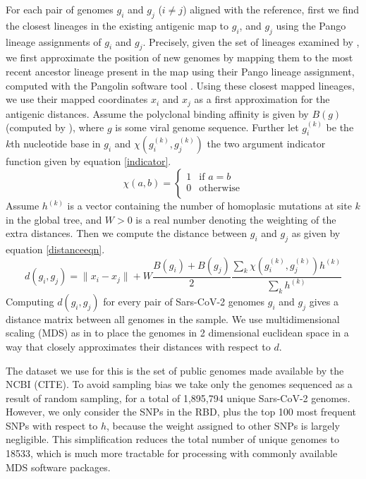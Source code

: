 \documentclass{article}
\begin{document}
For each pair of genomes $g_i$ and $g_j$ ($i\neq j$) aligned with the reference, first we find the closest lineages in the existing antigenic map to $g_i$, and $g_j$ using the Pango lineage assignments of $g_i$ and $g_j$. Precisely, given the set of lineages examined by \cite{wilksMappingSARSCoV2Antigenic2022}, we first approximate the position of new genomes by mapping them to the most recent ancestor lineage present in the map using their Pango lineage assignment, computed with the Pangolin software tool \cite{o2021assignment}. Using these closest mapped lineages, we use their mapped coordinates $x_i$ and $x_j$ as a first approximation for the antigenic distances.
Assume the polyclonal binding affinity is given by $B(g)$ (computed by \cite{greaney2022antibody}), where $g$ is some viral genome sequence. Further let $g_i^{(k)}$ be the $k$th nucleotide base in $g_i$ and $\chi(g_i^{(k)},g_j^{(k)})$ the two argument indicator function given by equation \ref{indicator}.
\begin{equation}
        \chi(a,b) =   \begin{cases}
        1 & \text{if $a = b$} \\
        0 & \text{otherwise} \\
    \end{cases}
    \label{indicator}
\end{equation}
Assume $h^{(k)}$ is a vector containing the number of homoplasic mutations at site $k$ in the global tree, and $W>0$ is a real number denoting the weighting of the extra distances.
Then we compute the distance between $g_i$ and $g_j$ as given by equation \ref{distanceeqn}.
\begin{equation}
    d(g_i,g_j) = \lVert x_i - x_j \rVert + W \frac{B(g_i) + B(g_j)}{2}\frac{\sum_k \chi\left(g_i^{(k)},g_j^{(k)}\right) h^{(k)}}{\sum_k h^{(k)}}
    \label{distanceeqn}
\end{equation}
Computing $d(g_i, g_j)$ for every pair of Sars-CoV-2 genomes $g_i$ and $g_j$ gives a distance matrix between all genomes in the sample.
We use multidimensional scaling (MDS) as in \cite{wilksMappingSARSCoV2Antigenic2022, lapedesGeometryShapeSpace2001} to place the genomes in 2 dimensional euclidean space in a way that closely approximates their distances with respect to $d$.


The dataset we use for this is the set of public genomes made available by the NCBI (CITE). 
To avoid sampling bias we take only the genomes sequenced as a result of random sampling, for a total of 1,895,794 unique Sars-CoV-2 genomes.
However, we only consider the SNPs in the RBD, plus the top 100 most frequent SNPs with respect to $h$, because the weight assigned to other SNPs is largely negligible. 
This simplification reduces the total number of unique genomes to 18533, which is much more tractable for processing with commonly available MDS software packages.
\end{document}
